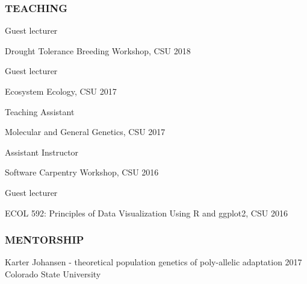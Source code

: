 \documentclass[12pt,english]{article}
\begin{document}

\subsubsection*{TEACHING}
\vspace{-0.5ex}\par
\hspace*{1.0em} Guest lecturer
\par
\hspace*{2.0em} Drought Tolerance Breeding Workshop, CSU
\hfill
2018
\par
\vspace{0.5em}
\hspace*{1.0em} Guest lecturer
\par
\hspace*{2.0em} Ecosystem Ecology, CSU
\hfill
2017
\par
\vspace{0.5em}
\hspace*{1.0em} Teaching Assistant
\par
\hspace*{2.0em} Molecular and General Genetics, CSU
\hfill
2017
\par
\vspace{0.5em}
\hspace*{1.0em} Assistant Instructor
\par
\hspace*{2.0em} Software Carpentry Workshop, CSU
\hfill
2016
\par
\vspace{0.5em}
\hspace*{1.0em} Guest lecturer
\par
\hspace*{2.0em} ECOL 592: Principles of Data Visualization Using R and ggplot2, CSU
\hfill
2016
\vspace{0.5em}
\par

\subsubsection*{MENTORSHIP}
\vspace{-0.5ex}\par

\hspace*{1.0em} Karter Johansen -  theoretical population genetics of poly-allelic adaptation
\hfill
2017\\
\hspace*{2.0em} Colorado State University
\end{document}
